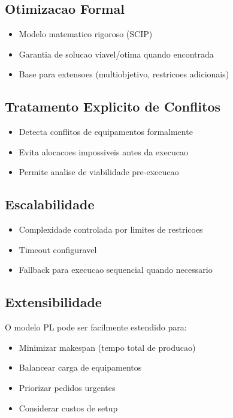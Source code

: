\documentclass[12pt,a4paper]{article}
\begin{document}
\subsection{Otimizacao Formal}

\begin{itemize}
    \item Modelo matematico rigoroso (SCIP)
    \item Garantia de solucao viavel/otima quando encontrada
    \item Base para extensoes (multiobjetivo, restricoes adicionais)
\end{itemize}

\subsection{Tratamento Explicito de Conflitos}

\begin{itemize}
    \item Detecta conflitos de equipamentos formalmente
    \item Evita alocacoes impossiveis antes da execucao
    \item Permite analise de viabilidade pre-execucao
\end{itemize}

\subsection{Escalabilidade}

\begin{itemize}
    \item Complexidade controlada por limites de restricoes
    \item Timeout configuravel
    \item Fallback para execucao sequencial quando necessario
\end{itemize}

\subsection{Extensibilidade}

O modelo PL pode ser facilmente estendido para:
\begin{itemize}
    \item Minimizar makespan (tempo total de producao)
    \item Balancear carga de equipamentos
    \item Priorizar pedidos urgentes
    \item Considerar custos de setup
\end{itemize}
\end{document}
